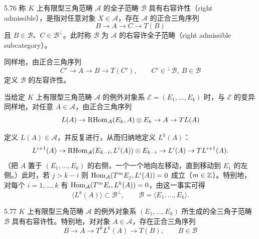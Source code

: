 
\begin{definition}{5.76} 称 $K$ 上有限型三角范畴 $\mathcal{A}$ 的全子范畴 $\mathcal{B}$ 具有右容许性（right admissible），是指对任意对象 $X \in \mathcal{A}$，存在 $\mathcal{A}$ 的正合三角序列
\[
  B \to A \to C \to T(B)
\]
且 $B \in \mathcal{B}$、$C \in \mathcal{B}^{\perp}$。此时称 $\mathcal{B}$ 为 $\mathcal{A}$ 的右容许全子范畴（right admissible subcategory）。

同样地，由正合三角序列
\[
  C' \to A \to B \to T(C'), \qquad C' \in {}^{\perp}\mathcal{B},\ B \in \mathcal{B}
\]
定义 $\mathcal{B}$ 的左容许性。\end{definition}

当给定 $K$ 上有限型三角范畴 $\mathcal{A}$ 的例外对象系 $\mathcal{E} = (E_{1},\ldots,E_{k})$ 时，与 $\mathcal{E}$ 的变异同样地，对任意 $A \in \mathcal{A}$，由正合三角序列
\[
  L(A) \to \operatorname{RHom}_{\mathcal{A}}(E_{k},A)\otimes E_{k} \to A \to TL(A)
\]

定义 $L(A) \in \mathcal{A}$，并反复进行，从而归纳地定义 $L^{k}(A)$：
\[
  L^{i+1}(A) \to \operatorname{RHom}_{\mathcal{A}}(E_{k-i},L^{i}(A))\otimes E_{k-i} \to L^{i}(A) \to TL^{i+1}(A).
\]
（把 $A$ 置于 $(E_{1},\ldots,E_{k})$ 的右侧，一个一个地向左移动，直到移动到 $E_{1}$ 的左侧。）此时，若 $j > k-i$ 则 $\operatorname{Hom}_{\mathcal{A}}(T^{m}E_{j},L^{i}(A)) = 0$ 成立（$m \in \mathbb{Z}$）。特别地，对每个 $i = 1,\ldots,k$ 有 $\operatorname{Hom}_{\mathcal{A}}(T^{m}E_{i},L^{k}(A)) = 0$，由这一事实可得
\[
  \langle L^{k}(A)\rangle \subset \mathcal{B}^{\perp}, \qquad \mathcal{B} = \langle E_{1},\ldots,E_{k}\rangle.
\]

\begin{lemma}{5.77} $K$ 上有限型三角范畴 $\mathcal{A}$ 的例外对象系 $(E_{1},\ldots,E_{k})$ 所生成的全三角子范畴 $\mathcal{B}$ 具有右容许性。特别地，对对象 $A \in \mathcal{A}$，存在正合三角序列
\begin{equation}
  B \to A \to T^{k}L^{k}(A) \to T(B), \qquad B \in \mathcal{B} \tag{5.40}
\end{equation}
\end{lemma}

